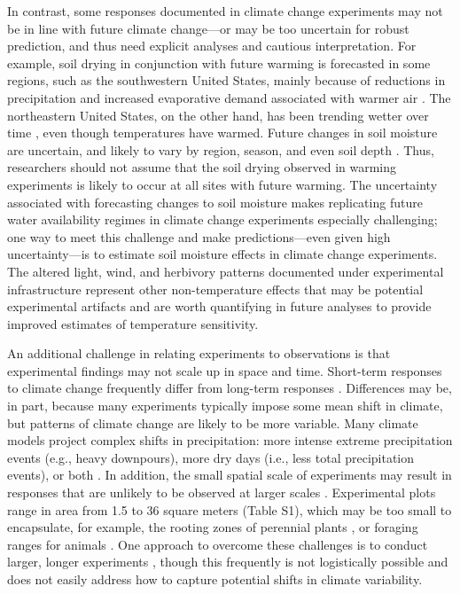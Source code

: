 \documentclass{article}
\begin{document}
\par In contrast, some responses documented in climate change experiments may not be in line with future climate change---or may be too uncertain for robust prediction, and thus need explicit analyses and cautious interpretation.
For example, soil drying in conjunction with future warming is forecasted in some regions, such as the southwestern United States, mainly because of reductions in precipitation and increased evaporative demand associated with warmer air \citep{dai2013,seager2013}. The northeastern United States, on the other hand, has been trending wetter over time \citep{shuman2017}, even though temperatures have warmed. Future changes in soil moisture are uncertain, and likely to vary by region, season, and even soil depth \citep{seager2014,berg2017}. Thus, researchers should not assume that the soil drying observed in warming experiments is likely to occur at all sites with future warming. The uncertainty associated with forecasting changes to soil moisture makes replicating future water availability regimes in climate change experiments especially challenging; one way to meet this challenge and make predictions---even given high uncertainty---is to estimate soil moisture effects in climate change experiments. The altered light, wind, and herbivory patterns documented under experimental infrastructure \citep{kennedy1995,moise2010,wolkovich2012,hoeppner2012, clark2014b} represent other non-temperature effects that may be potential experimental artifacts and are worth quantifying in future analyses to provide improved estimates of temperature sensitivity.
\par An additional challenge in relating experiments to observations is that experimental findings may not scale up in space and time. Short-term responses to climate change frequently differ from long-term responses \citep{woodward1992,elmendorf2012, andresen2016, reich2018}. Differences may be, in part, because many experiments typically impose some mean shift in climate, but patterns of climate change are likely to be more variable. Many climate models project complex shifts in precipitation: more intense extreme precipitation events (e.g., heavy downpours), more dry days (i.e., less total precipitation events), or both \citep{polade2014}. In addition, the small spatial scale of experiments may result in responses that are unlikely to be observed at larger scales \citep{woodward1992,menke2014}. Experimental plots range in area from 1.5 to 36 square meters (Table S1), which may be too small to encapsulate, for example, the rooting zones of perennial plants \citep{canadell1996}, or foraging ranges for animals \citep{menke2014}. One approach to overcome these challenges is to conduct larger, longer experiments \citep{woodward1992}, though this frequently is not logistically possible and does not easily address how to capture potential shifts in climate variability. 
\end{document}
